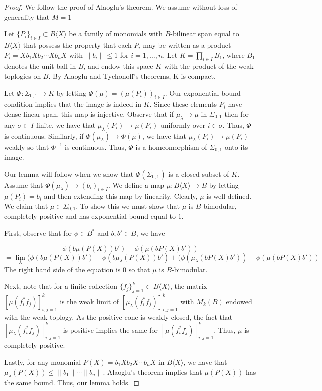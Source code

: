 \documentclass[11pt]{amsart}
\begin{document}
\begin{proof}
We follow the proof of Alaoglu's theorem.  We assume without loss of generality that $M=1$

Let $\{P_{i} \}_{i\in I} \subset B\langle X \rangle$ be a family of monomials with $B$-bilinear span equal to $B\langle X \rangle$ that possess the property
that each $P_{i}$ may be written as a product $P_{i} = Xb_{1}Xb_{2}\cdots Xb_{n}X$ with  $\| b_{i} \| \leq 1$ for $i=1,\ldots,n$.  
Let $K = \prod_{i\in I} B_{1}$, where $B_{1}$ denotes the unit ball in $B$, and endow this space $K$ with the product of the weak toplogies on $B$.  By 
Alaoglu and Tychonoff's theorems, K is compact.

Let $\Phi: \Sigma_{0,1} \rightarrow K$ by letting $\Phi(\mu) = (\mu(P_{i}))_{i\in I}$.  Our exponential bound condition implies that the image is indeed in $K$.
Since these elements $P_{i}$ have dense linear span,
this map is injective.  Observe that if $\mu_{\lambda} \rightarrow \mu$ in $\Sigma_{0,1}$ then for any $\sigma \subset I$ finite, we have that
$\mu_{\lambda}(P_{i}) \rightarrow \mu(P_{i})$ uniformly over $i\in \sigma$.  Thus, $\Phi$ is continuous.  Similarly, if $\Phi(\mu_{\lambda}) \rightarrow \Phi(\mu)$,
we have that $\mu_{\lambda}(P_{i}) \rightarrow \mu(P_{i})$ weakly so that $\Phi^{-1}$ is continuous.  Thus, $\Phi$ is a homeomorphism of $\Sigma_{0,1}$ onto its image.

Our lemma will follow when we show that $\Phi(\Sigma_{0,1})$ is a closed subset of $K$.  Assume that $\Phi(\mu_{\lambda}) \rightarrow (b_{i})_{i\in I}$.  We define a map
$\mu : B\langle X \rangle \rightarrow B$ by letting $\mu(P_{i}) = b_{i}$ and then extending this map by linearity.  Clearly, $\mu$ is well defined.  We claim that
$\mu \in \Sigma_{0,1}$.  To show this we must show that $\mu$ is $B$-bimodular, completely positive and has exponential bound equal to $1$.

First, observe that for $\phi \in B^{\ast}$ and $b,b' \in B$, we have 

 $$\phi(b\mu(P(X))b') - \phi(\mu(bP(X)b')) $$
$$ = \lim_{\lambda} (\phi(b\mu(P(X))b') - \phi(b\mu_{\lambda}(P(X))b') + (\phi(\mu_{\lambda}(bP(X)b')) -  \phi(\mu(bP(X)b'))$$
The right hand side of the equation is $0$ so that $\mu$ is $B$-bimodular.

Next, note that for a finite collection $\{f_{j} \}_{j=1}^{k} \subset B\langle X \rangle$, the matrix
$[\mu(f_{i}^{\ast}f_{j}) ]_{i,j=1}^{k}$ is the weak limit of $[\mu_{\lambda}(f_{i}^{\ast}f_{j}) ]_{i,j=1}^{k}$
with $M_{k}(B)$ endowed with the weak toplogy.  As the positive cone is weakly closed, the fact that $[\mu_{\lambda}(f_{i}^{\ast}f_{j}) ]_{i,j=1}^{k}$
is positive implies the same for $[\mu(f_{i}^{\ast}f_{j}) ]_{i,j=1}^{k}$.  Thus, $\mu$ is completely positive.

Lastly, for any monomial $P(X) = b_{1}Xb_{2}X\cdots b_{n}X$ in $B\langle X \rangle$, we have that $\mu_{\lambda}(P(X)) \leq \|b_{1} \| \cdots \|b_{n} \|$.
Alaoglu's theorem implies that $\mu(P(X))$ has the same bound.  Thus, our lemma holds.
\end{proof}
\end{document}
